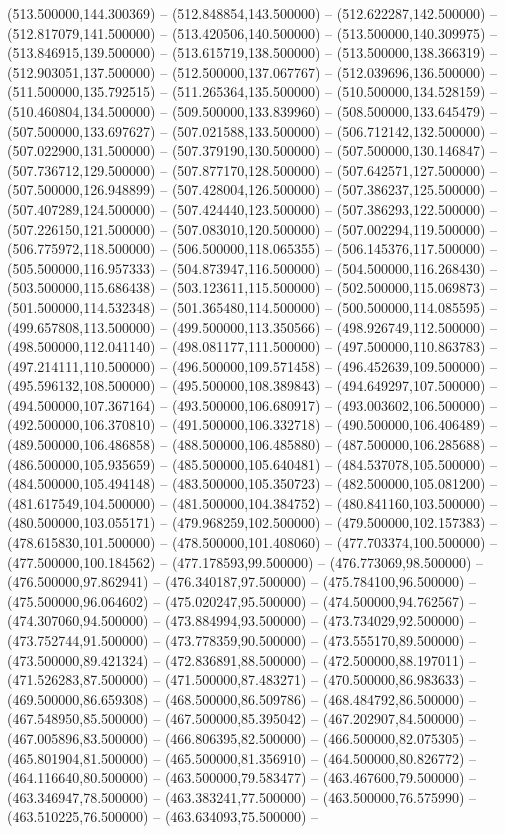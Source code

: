 (513.500000,144.300369) -- (512.848854,143.500000) -- (512.622287,142.500000) -- (512.817079,141.500000) -- (513.420506,140.500000) -- (513.500000,140.309975) -- (513.846915,139.500000) -- (513.615719,138.500000) -- (513.500000,138.366319) -- (512.903051,137.500000) -- (512.500000,137.067767) -- (512.039696,136.500000) -- (511.500000,135.792515) -- (511.265364,135.500000) -- (510.500000,134.528159) -- (510.460804,134.500000) -- (509.500000,133.839960) -- (508.500000,133.645479) -- (507.500000,133.697627) -- (507.021588,133.500000) -- (506.712142,132.500000) -- (507.022900,131.500000) -- (507.379190,130.500000) -- (507.500000,130.146847) -- (507.736712,129.500000) -- (507.877170,128.500000) -- (507.642571,127.500000) -- (507.500000,126.948899) -- (507.428004,126.500000) -- (507.386237,125.500000) -- (507.407289,124.500000) -- (507.424440,123.500000) -- (507.386293,122.500000) -- (507.226150,121.500000) -- (507.083010,120.500000) -- (507.002294,119.500000) -- (506.775972,118.500000) -- (506.500000,118.065355) -- (506.145376,117.500000) -- (505.500000,116.957333) -- (504.873947,116.500000) -- (504.500000,116.268430) -- (503.500000,115.686438) -- (503.123611,115.500000) -- (502.500000,115.069873) -- (501.500000,114.532348) -- (501.365480,114.500000) -- (500.500000,114.085595) -- (499.657808,113.500000) -- (499.500000,113.350566) -- (498.926749,112.500000) -- (498.500000,112.041140) -- (498.081177,111.500000) -- (497.500000,110.863783) -- (497.214111,110.500000) -- (496.500000,109.571458) -- (496.452639,109.500000) -- (495.596132,108.500000) -- (495.500000,108.389843) -- (494.649297,107.500000) -- (494.500000,107.367164) -- (493.500000,106.680917) -- (493.003602,106.500000) -- (492.500000,106.370810) -- (491.500000,106.332718) -- (490.500000,106.406489) -- (489.500000,106.486858) -- (488.500000,106.485880) -- (487.500000,106.285688) -- (486.500000,105.935659) -- (485.500000,105.640481) -- (484.537078,105.500000) -- (484.500000,105.494148) -- (483.500000,105.350723) -- (482.500000,105.081200) -- (481.617549,104.500000) -- (481.500000,104.384752) -- (480.841160,103.500000) -- (480.500000,103.055171) -- (479.968259,102.500000) -- (479.500000,102.157383) -- (478.615830,101.500000) -- (478.500000,101.408060) -- (477.703374,100.500000) -- (477.500000,100.184562) -- (477.178593,99.500000) -- (476.773069,98.500000) -- (476.500000,97.862941) -- (476.340187,97.500000) -- (475.784100,96.500000) -- (475.500000,96.064602) -- (475.020247,95.500000) -- (474.500000,94.762567) -- (474.307060,94.500000) -- (473.884994,93.500000) -- (473.734029,92.500000) -- (473.752744,91.500000) -- (473.778359,90.500000) -- (473.555170,89.500000) -- (473.500000,89.421324) -- (472.836891,88.500000) -- (472.500000,88.197011) -- (471.526283,87.500000) -- (471.500000,87.483271) -- (470.500000,86.983633) -- (469.500000,86.659308) -- (468.500000,86.509786) -- (468.484792,86.500000) -- (467.548950,85.500000) -- (467.500000,85.395042) -- (467.202907,84.500000) -- (467.005896,83.500000) -- (466.806395,82.500000) -- (466.500000,82.075305) -- (465.801904,81.500000) -- (465.500000,81.356910) -- (464.500000,80.826772) -- (464.116640,80.500000) -- (463.500000,79.583477) -- (463.467600,79.500000) -- (463.346947,78.500000) -- (463.383241,77.500000) -- (463.500000,76.575990) -- (463.510225,76.500000) -- (463.634093,75.500000) -- 